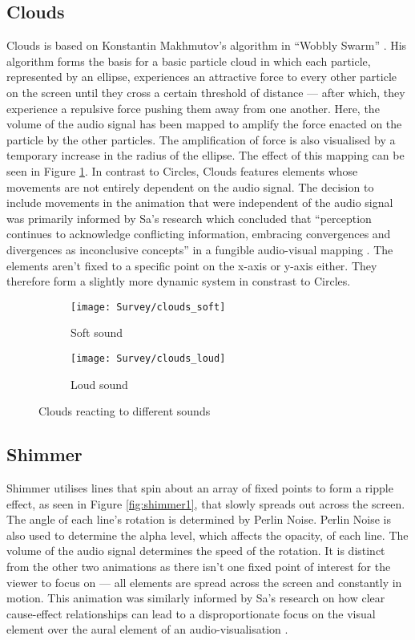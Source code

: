 \documentclass[../initial_thesis.tex]{subfiles}
\begin{document}
\subsection{Clouds}
Clouds is based on Konstantin Makhmutov's algorithm in ``Wobbly Swarm'' \cite{Makhmutov}. His algorithm forms the basis for a basic particle cloud in which each particle, represented by an ellipse, experiences an attractive force to every other particle on the screen until they cross a certain threshold of distance --- after which, they experience a repulsive force pushing them away from one another. Here, the volume of the audio signal has been mapped to amplify the force enacted on the particle by the other particles. The amplification of force is also visualised by a temporary increase in the radius of the ellipse. The effect of this mapping can be seen in Figure \ref{fig:clouds1}. In contrast to Circles, Clouds features elements whose movements are not entirely dependent on the audio signal. The decision to include movements in the animation that were independent of the audio signal was primarily informed by Sa's research which concluded that ``perception continues to acknowledge conflicting information, embracing convergences and divergences as inconclusive concepts'' in a fungible audio-visual mapping \cite{Sa2014}. The elements aren't fixed to a specific point on the x-axis or y-axis either. They therefore form a slightly more dynamic system in constrast to Circles.

\begin{figure}
  \begin{subfigure}{0.5\textwidth}
    \texttt{[image: Survey/clouds\_soft]}
    \caption{Soft sound}
  \end{subfigure} 
  \begin{subfigure}{0.5\textwidth}
    \texttt{[image: Survey/clouds\_loud]}
    \caption{Loud sound}
  \end{subfigure}
  \caption{Clouds reacting to different sounds}
  \label{fig:clouds1}
\end{figure}

\subsection{Shimmer}
Shimmer utilises lines that spin about an array of fixed points to form a ripple effect, as seen in Figure \ref{fig:shimmer1}, that slowly spreads out across the screen. The angle of each line's rotation is determined by Perlin Noise. Perlin Noise is also used to determine the alpha level, which affects the opacity, of each line. The volume of the audio signal determines the speed of the rotation. It is distinct from the other two animations as there isn't one fixed point of interest for the viewer to focus on --- all elements are spread across the screen and constantly in motion. This animation was similarly informed by Sa's research on how clear cause-effect relationships can lead to a disproportionate focus on the visual element over the aural element of an audio-visualisation \cite{Sa2014}.
\end{document}
